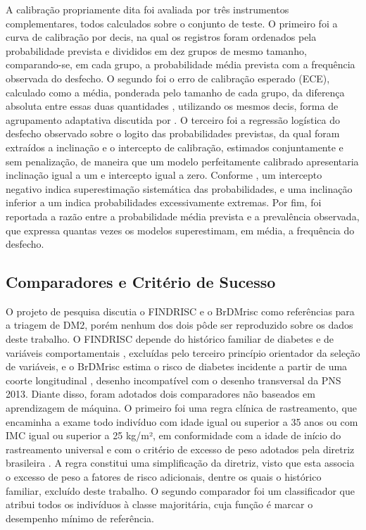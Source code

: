 A calibração propriamente dita foi avaliada por três instrumentos complementares, todos calculados sobre o conjunto de teste. O primeiro foi a curva de calibração por decis, na qual os registros foram ordenados pela probabilidade prevista e divididos em dez grupos de mesmo tamanho, comparando-se, em cada grupo, a probabilidade média prevista com a frequência observada do desfecho. O segundo foi o erro de calibração esperado (ECE), calculado como a média, ponderada pelo tamanho de cada grupo, da diferença absoluta entre essas duas quantidades \cite{guo2017calibration}, utilizando os mesmos decis, forma de agrupamento adaptativa discutida por \textcite{posocco2021ece}. O terceiro foi a regressão logística do desfecho observado sobre o logito das probabilidades previstas, da qual foram extraídos a inclinação e o intercepto de calibração, estimados conjuntamente e sem penalização, de maneira que um modelo perfeitamente calibrado apresentaria inclinação igual a um e intercepto igual a zero. Conforme \textcite{vandengoorbergh2022harm}, um intercepto negativo indica superestimação sistemática das probabilidades, e uma inclinação inferior a um indica probabilidades excessivamente extremas. Por fim, foi reportada a razão entre a probabilidade média prevista e a prevalência observada, que expressa quantas vezes os modelos superestimam, em média, a frequência do desfecho.

\subsection{Comparadores e Critério de Sucesso}\label{sec:comparadores}
O projeto de pesquisa discutia o FINDRISC e o BrDMrisc como referências para a triagem de DM2, porém nenhum dos dois pôde ser reproduzido sobre os dados deste trabalho. O FINDRISC depende do histórico familiar de diabetes e de variáveis comportamentais \cite{conceiccao2020translation}, excluídas pelo terceiro princípio orientador da seleção de variáveis, e o BrDMrisc estima o risco de diabetes incidente a partir de uma coorte longitudinal \cite{bracco2026brdmrisc}, desenho incompatível com o desenho transversal da PNS 2013. Diante disso, foram adotados dois comparadores não baseados em aprendizagem de máquina. O primeiro foi uma regra clínica de rastreamento, que encaminha a exame todo indivíduo com idade igual ou superior a 35 anos ou com IMC igual ou superior a 25 kg/m², em conformidade com a idade de início do rastreamento universal e com o critério de excesso de peso adotados pela diretriz brasileira \cite{Rodacki2025}. A regra constitui uma simplificação da diretriz, visto que esta associa o excesso de peso a fatores de risco adicionais, dentre os quais o histórico familiar, excluído deste trabalho. O segundo comparador foi um classificador que atribui todos os indivíduos à classe majoritária, cuja função é marcar o desempenho mínimo de referência.

